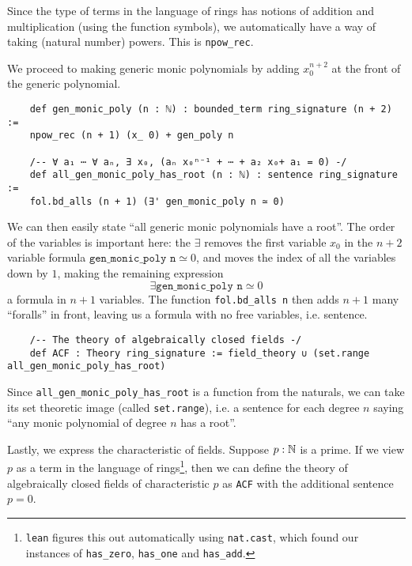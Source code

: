 \begin{dfn}
  Since the type of terms in the language of rings has notions of
  addition and multiplication (using the function symbols),
  we automatically have a way of taking (natural number) powers.
  This is \texttt{npow\_rec}.

  We proceed to making generic monic polynomials by adding
  $x_{0}^{n+2}$ at the front of the generic polynomial.

  \begin{lstlisting}
    def gen_monic_poly (n : ℕ) : bounded_term ring_signature (n + 2) :=
    npow_rec (n + 1) (x_ 0) + gen_poly n

    /-- ∀ a₁ ⋯ ∀ aₙ, ∃ x₀, (aₙ x₀ⁿ⁻¹ + ⋯ + a₂ x₀+ a₁ = 0) -/
    def all_gen_monic_poly_has_root (n : ℕ) : sentence ring_signature :=
    fol.bd_alls (n + 1) (∃' gen_monic_poly n ≃ 0) \end{lstlisting}

  We can then easily state ``all generic monic polynomials have a root''.
  The order of the variables is important here:
  the $\exists$ removes the first variable $x_{0}$ in the $n+2$ variable formula
  $\texttt{gen\_monic\_poly n} \simeq 0$, and moves the index of all the
  variables down by $1$, making the remaining expression
  \[\exists \texttt{gen\_monic\_poly n} \simeq 0\] a formula in $n+1$ variables.
  The function \texttt{fol.bd\_alls n} then adds $n+1$ many ``foralls''
  in front, leaving us a formula with no free variables, i.e. sentence.

  \begin{lstlisting}
    /-- The theory of algebraically closed fields -/
    def ACF : Theory ring_signature := field_theory ∪ (set.range all_gen_monic_poly_has_root)\end{lstlisting}

  Since \texttt{all\_gen\_monic\_poly\_has\_root} is a function from the naturals,
  we can take its set theoretic image (called \texttt{set.range}),
  i.e. a sentence for each degree $n$ saying
  ``any monic polynomial of degree $n$ has a root''.

  Lastly, we express the characteristic of fields.
  Suppose $p : \mathbb{N}$ is a prime.
  If we view $p$ as a term in the language of rings\footnote{
    \texttt{lean} figures this out automatically using \texttt{nat.cast},
    which found our instances of \texttt{has\_zero}, \texttt{has\_one}
    and \texttt{has\_add}.
  },
  then we can define the theory of algebraically closed fields of characteristic $p$
  as \texttt{ACF} with the additional sentence $p = 0$.


\end{dfn}
